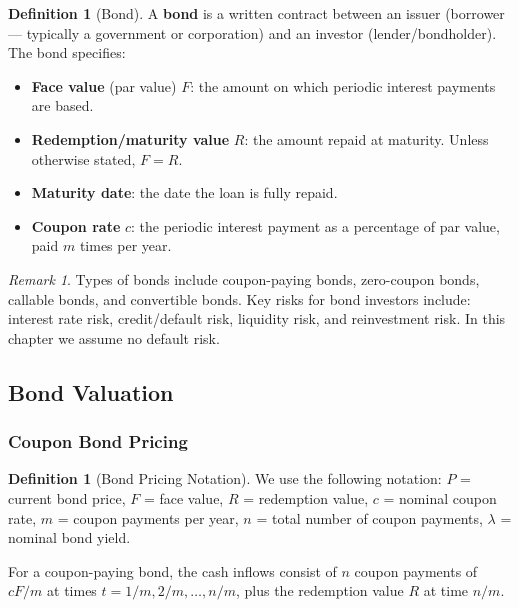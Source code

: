 \documentclass[12pt, a4paper]{article}
\theoremstyle{plain}
\theoremstyle{definition}
\newtheorem{definition}[theorem]{Definition}
\theoremstyle{remark}
\newtheorem{remark}[theorem]{Remark}
\begin{document}
\begin{definition}[Bond]
  A \textbf{bond} is a written contract between an issuer (borrower — typically a government or corporation) and an investor (lender/bondholder). The bond specifies:
  \begin{itemize}
    \item \textbf{Face value} (par value) $F$: the amount on which periodic interest payments are based.
    \item \textbf{Redemption/maturity value} $R$: the amount repaid at maturity. Unless otherwise stated, $F = R$.
    \item \textbf{Maturity date}: the date the loan is fully repaid.
    \item \textbf{Coupon rate} $c$: the periodic interest payment as a percentage of par value, paid $m$ times per year.
  \end{itemize}
\end{definition}

\begin{remark}
  Types of bonds include coupon-paying bonds, zero-coupon bonds, callable bonds, and convertible bonds. Key risks for bond investors include: interest rate risk, credit/default risk, liquidity risk, and reinvestment risk. In this chapter we assume no default risk.
\end{remark}

\subsection{Bond Valuation}

\subsubsection{Coupon Bond Pricing}

\begin{definition}[Bond Pricing Notation]
  We use the following notation:
  $P$ = current bond price, $F$ = face value, $R$ = redemption value, $c$ = nominal coupon rate, $m$ = coupon payments per year, $n$ = total number of coupon payments, $\lambda$ = nominal bond yield.
\end{definition}

For a coupon-paying bond, the cash inflows consist of $n$ coupon payments of $cF/m$ at times $t = 1/m, 2/m, \ldots, n/m$, plus the redemption value $R$ at time $n/m$.
\end{document}
